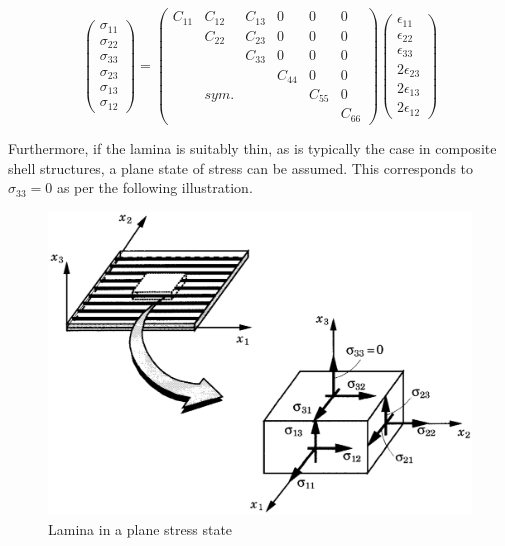 \begin{equation} 
\begin{pmatrix}
\sigma_{11} \\
\sigma_{22} \\
\sigma_{33} \\
\sigma_{23} \\
\sigma_{13} \\
\sigma_{12}
\end{pmatrix}
=
\begin{pmatrix}
C_{11} & C_{12} & C_{13} & 0 & 0 & 0 \\
\  & C_{22} & C_{23} & 0 & 0 & 0 \\
\  & \  & C_{33} & 0 & 0 & 0 \\
\  & \  & \  & C_{44} & 0 & 0 \\
\  & sym. & \  & \ & C_{55} & 0 \\
\  & \  & \  & \  & \  & C_{66}
\end{pmatrix}
\begin{pmatrix}
\epsilon_{11} \\
\epsilon_{22} \\
\epsilon_{33} \\
2\epsilon_{23} \\
2\epsilon_{13} \\
2\epsilon_{12}
\end{pmatrix}
\label{eqscomp3}
\end{equation}

Furthermore, if the lamina is suitably thin, as is typically the case in composite shell structures, a plane state of stress can be assumed. This corresponds to $\sigma_{33} = 0$ as per the following illustration.

\begin{figure}[h!]
	\centering
	\includegraphics[width=12cm]{images/composite_lamina_plane_stress}
	\caption{Lamina in a plane stress state \cite{reddy2004mechanics}}
	\label{fig:compositelaminaplanestress}
\end{figure}


